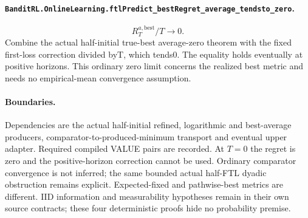 \paragraph{\texttt{BanditRL.OnlineLearning.ftlPredict\_bestRegret\_average\_tendsto\_zero}.}
\[R_T^{a,\mathrm{best}}/T\longrightarrow0.\]
Combine the actual half-initial true-best average-zero theorem with the fixed first-loss correction divided byT, which tends0. The equality holds eventually at positive horizons. This ordinary zero limit concerns the realized best metric and needs no empirical-mean convergence assumption.\par
\paragraph{Boundaries.} Dependencies are the actual half-initial refined, logarithmic and best-average producers, comparator-to-produced-minimum transport and eventual upper adapter. Required compiled VALUE pairs are recorded. At $T=0$ the regret is zero and the positive-horizon correction cannot be used. Ordinary comparator convergence is not inferred; the same bounded actual half-FTL dyadic obstruction remains explicit. Expected-fixed and pathwise-best metrics are different. IID information and measurability hypotheses remain in their own source contracts; these four deterministic proofs hide no probability premise.
